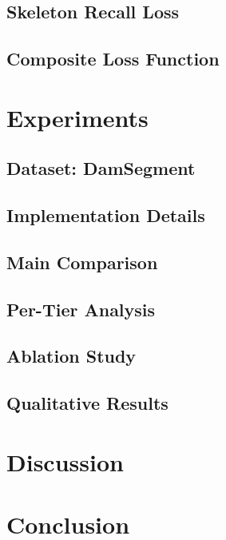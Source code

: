\documentclass[10pt,twocolumn,letterpaper]{article}
\begin{document}
\subsection{Skeleton Recall Loss}
\subsection{Composite Loss Function}

\section{Experiments}
\subsection{Dataset: DamSegment}
\subsection{Implementation Details}
\subsection{Main Comparison}
\subsection{Per-Tier Analysis}
\subsection{Ablation Study}
\subsection{Qualitative Results}

\section{Discussion}

\section{Conclusion}

{\small


}
\end{document}
